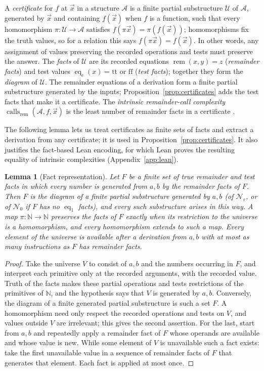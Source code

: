 \documentclass[11pt]{article}
\newtheorem{lemma}[theorem]{Lemma}
\theoremstyle{remark}
\newcommand{\rem}{\operatorname{rem}}
\newcommand{\calls}{\operatorname{calls}}
\newcommand{\eq}{\operatorname{eq}}
\begin{document}
A \emph{certificate} for $f$ at $\vec x$ in a structure $\mathcal A$ is a
finite partial substructure $\mathcal U$ of $\mathcal A$, generated by
$\vec x$ and containing $f(\vec x)$ when $f$ is a function, such that every
homomorphism $\pi:\mathcal U\to\mathcal A$ satisfies
$f(\pi\vec x)=\pi(f(\vec x))$; homomorphisms fix the truth values, so for a
relation this says $f(\pi\vec x)=f(\vec x)$. In other words, any assignment
of values preserving the recorded operations and tests must preserve the
answer. The \emph{facts} of $\mathcal U$ are its recorded equations
$\rem(x,y)=z$ (\emph{remainder facts}) and test values
$\eq_c(x)=\mathrm{tt}$ or $\mathrm{ff}$ (\emph{test facts}); together they
form the \emph{diagram} of $\mathcal U$. The remainder equations of a
derivation form a finite partial substructure generated by the inputs;
Proposition~\ref{prop:certificates} adds the test facts that make it a
certificate. The \emph{intrinsic remainder-call complexity} $\calls_{\rem}(\mathcal A,f,\vec x)$ is the least
number of remainder facts in a certificate
\cite[\S\S1D, 4C--4E]{moschovakis2019}.

The following lemma lets us treat certificates as finite sets of facts and
extract a derivation from any certificate; it is used in
Proposition~\ref{prop:certificates}. It also justifies the fact-based Lean
encoding, for which Lean proves the resulting equality of intrinsic
complexities (Appendix~\ref{app:lean}).

\begin{lemma}[Fact representation]\label{lem:fact-representation}
Let $F$ be a finite set of true remainder and test facts in which every
number is generated from $a,b$ by the remainder facts of $F$. Then $F$ is
the diagram of a finite partial substructure generated by $a,b$ (of
$\mathcal N_\varepsilon$, or of $\mathcal N_0$ if $F$ has no $\eq_1$
facts), and every such substructure arises in this way. A map
$\pi:\mathbb N\to\mathbb N$ preserves the facts of $F$ exactly when its
restriction to the universe is a homomorphism, and every homomorphism
extends to such a map. Every element of the universe is available after
a derivation from $a,b$ with at most as many instructions as $F$ has
remainder facts.
\end{lemma}
\begin{proof}
Take the universe $V$ to consist of $a,b$ and the numbers occurring in $F$,
and interpret each primitive only at the recorded arguments, with the
recorded value. Truth of the facts makes these partial operations and
tests restrictions of the primitives of $\mathbb N$, and the hypothesis says that $V$ is generated by
$a,b$. Conversely, the diagram of a finite generated partial substructure is
such a set $F$. A homomorphism need only respect the recorded operations and
tests on $V$, and values outside $V$ are irrelevant; this gives the second
assertion. For the last, start from $a,b$ and repeatedly apply a remainder
fact of $F$ whose operands are available and whose value is new. While some
element of $V$ is unavailable such a fact exists: take the first
unavailable value in a sequence of remainder facts of $F$ that generates
that element. Each fact is applied at
most once.
\end{proof}
\end{document}
